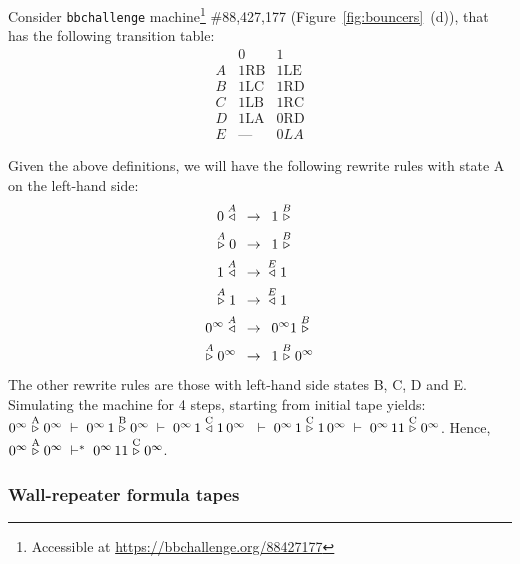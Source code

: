 \begin{example}\label{ex:bouncer88427177}
    Consider \texttt{bbchallenge} machine\footnote{Accessible at \url{https://bbchallenge.org/88427177}} \#88,427,177 (Figure~\ref{fig:bouncers}~(d)), that has the following transition table:
    \[
        \begin{array}{l|ll}
              & 0          & 1          \\
            \hline
            A & 1\text{RB} & 1\text{LE} \\
            B & 1\text{LC} & 1\text{RD} \\
            C & 1\text{LB} & 1\text{RC} \\
            D & 1\text{LA} & 0\text{RD} \\
            E & \mbox{---} & 0LA
        \end{array}
    \]

    Given the above definitions, we will have the following rewrite rules with state A on the left-hand side:
    \begin{align*}
        0 \stackrel{A}\triangleleft\,\,\,        & \to\,\,\, 1 \stackrel{B}\triangleright          \\
        \stackrel{A}\triangleright 0\,\,\,        & \to\,\,\, 1 \stackrel{B}\triangleright          \\
        1 \stackrel{A}\triangleleft\,\,\,        & \to\,\,\, \stackrel{E}\triangleleft 1          \\
        \stackrel{A}\triangleright 1\,\,\,        & \to\,\,\, \stackrel{E}\triangleleft 1          \\
        0^\infty \stackrel{A}\triangleleft\,\,\, & \to\,\,\, 0^\infty 1 \stackrel{B}\triangleright \\
        \stackrel{A}\triangleright 0^\infty\,\,\, & \to\,\,\, 1 \stackrel{B}\triangleright 0^\infty
    \end{align*}
    The other rewrite rules are those with left-hand side states B, C, D and E. Simulating the machine for 4 steps, starting from initial tape yields:
    $ 0^\infty \rhead{\text{A}} 0^\infty \;\vdash\; 0^\infty \, 1 \rhead{\text{B}} 0^\infty \;\vdash\; 0^\infty \, 1 \lhead{\text{C}} 1\, 0^\infty\ \;\vdash\; 0^\infty \, 1 \rhead{\text{C}} 1\, 0^\infty \;\vdash\; 0^\infty \, 1 1 \rhead{\text{C}} 0^\infty$. Hence, $0^\infty \stackrel{\text{A}}\triangleright 0^\infty \;\vdash^*\; 0^\infty \, 1 1 \stackrel{\text{C}}\triangleright 0^\infty$.
\end{example}

\subsubsection{Wall-repeater formula tapes}

